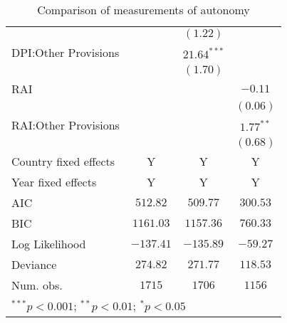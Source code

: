 \begin{table}[!htbp]
\begin{center}
\begin{tabular}{l c c c}
                      &                & $(1.22)$       &                \\
DPI:Other Provisions  &                & $21.64^{***}$  &                \\
                      &                & $(1.70)$       &                \\
RAI                   &                &                & $-0.11$        \\
                      &                &                & $(0.06)$       \\
RAI:Other Provisions  &                &                & $1.77^{**}$    \\
                      &                &                & $(0.68)$       \\
\hline
Country fixed effects & Y              & Y              & Y              \\
Year fixed effects    & Y              & Y              & Y              \\
AIC                   & $512.82$       & $509.77$       & $300.53$       \\
BIC                   & $1161.03$      & $1157.36$      & $760.33$       \\
Log Likelihood        & $-137.41$      & $-135.89$      & $-59.27$       \\
Deviance              & $274.82$       & $271.77$       & $118.53$       \\
Num. obs.             & $1715$         & $1706$         & $1156$         \\
\hline
\multicolumn{4}{l}{\scriptsize{$^{***}p<0.001$; $^{**}p<0.01$; $^{*}p<0.05$}}
\end{tabular}
\caption{Comparison of measurements of autonomy}
\label{table:coefficients}
\end{center}
\end{table}
